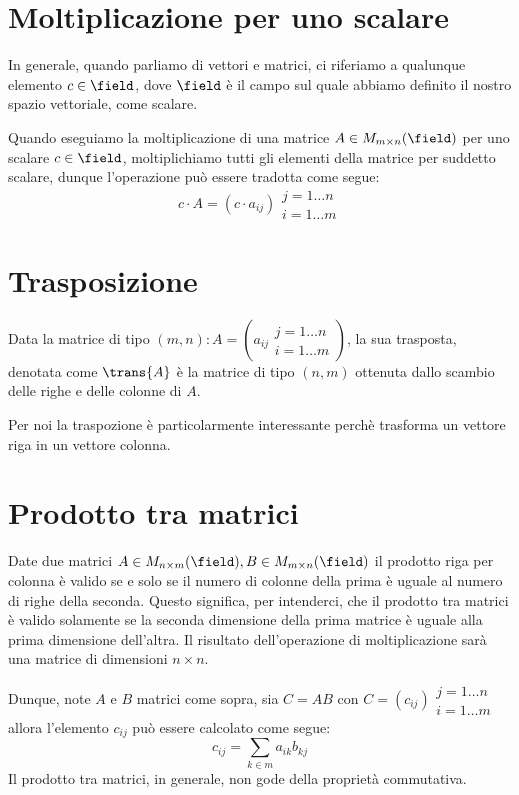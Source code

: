 \section{Moltiplicazione per uno scalare}
In generale, quando parliamo di vettori e matrici, ci riferiamo a qualunque elemento $c \in \field$, dove $\field$ è il campo sul quale abbiamo definito il nostro spazio vettoriale, come scalare.

Quando eseguiamo la moltiplicazione di una matrice $A \in M_{m \times n}(\field)$ per uno scalare $c \in \field$, moltiplichiamo tutti gli elementi della matrice per suddetto scalare, dunque l'operazione può essere tradotta come segue:
\begin{equation}
	c \cdot A = (c \cdot a_{ij})\substack{\scriptstyle j = 1 \dots n \\ \scriptstyle i = 1 \dots m}
\end{equation}
\section{Trasposizione}
Data la matrice di tipo $(m, n): A = (a_{ij}\substack{\scriptstyle j = 1 \dots n \\ \scriptstyle i = 1 \dots m})$, la sua trasposta, denotata come $\trans{A}$ è la matrice di tipo $(n, m)$ ottenuta dallo scambio delle righe e delle colonne di $A$.

Per noi la traspozione è particolarmente interessante perchè trasforma un vettore riga in un vettore colonna.
\section{Prodotto tra matrici}
Date due matrici $A \in M_{n \times m}(\field), B \in M_{m \times n}(\field)$ il prodotto riga per colonna è valido se e solo se il numero di colonne della prima è uguale al numero di righe della seconda. Questo significa, per intenderci, che il prodotto tra matrici è valido solamente se la seconda dimensione della prima matrice è uguale alla prima dimensione dell'altra.
Il risultato dell'operazione di moltiplicazione sarà una matrice di dimensioni $n \times n$.

Dunque, note $A$ e $B$ matrici come sopra, sia $C = AB$ con $C = (c_{ij})\substack{\scriptstyle j = 1 \dots n \\ \scriptstyle i = 1 \dots m}$ allora l'elemento $c_{ij}$ può essere calcolato come segue:
\begin{equation}
	c_{ij} = \sum_{k \in m}a_{ik}b_{kj}
\end{equation}
Il prodotto tra matrici, in generale, non gode della proprietà commutativa.
